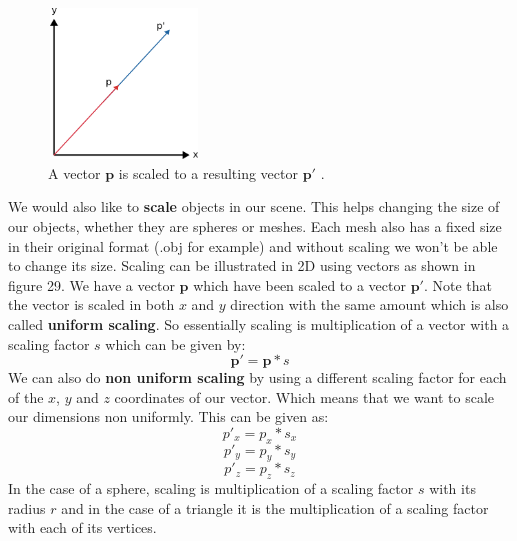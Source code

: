\documentclass[11pt,a4paper]{article}
\begin{document}
	\begin{figure}
		\includegraphics[width=4cm,height=4cm]{scale} 
		\caption{A vector $\boldsymbol{p}$ is scaled to a resulting vector $\boldsymbol{p'}$ \protect\cite{2dtransformations}.}
		\label{fig:scale}
	\end{figure}
	We would also like to \textbf{scale} objects in our scene. This helps changing the size of our objects, whether they are spheres or meshes. Each mesh also has a fixed size in their original format (.obj for example) and without scaling we won't be able to change its size. Scaling can be illustrated in 2D using vectors as shown in figure 29. We have a vector $\boldsymbol{p}$ which have been scaled to a vector $\boldsymbol{p'}$. Note that the vector is scaled in both $x$ and $y$ direction with the same amount which is also called \textbf{uniform scaling}. So essentially scaling is multiplication of a vector with a scaling factor $s$ which can be given by:
	\begin{equation}
	\boldsymbol{p'} = \boldsymbol{p}*s
	\end{equation}
	We can also do \textbf{non uniform scaling} by using a different scaling factor for each of the $x$, $y$ and $z$ coordinates of our vector. Which means that we want to scale our dimensions non uniformly. This can be given as:
	\begin{equation}
	p'_{x} = p_{x}*s_{x}
	\end{equation}
	\begin{equation}
	p'_{y} = p_{y}*s_{y}
	\end{equation}
	\begin{equation}
	p'_{z} = p_{z}*s_{z}
	\end{equation}
	In the case of a sphere, scaling is multiplication of a scaling factor $s$ with its radius $r$ and in the case of a triangle it is the multiplication of a scaling factor with each of its vertices.
	
\end{document}
